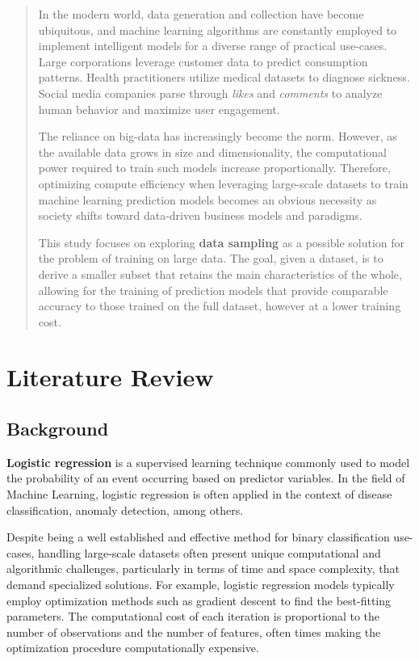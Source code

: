 \documentclass{article}
\theoremstyle{plain}
\theoremstyle{definition}
\theoremstyle{remark}
\begin{document}
\begin{abstract}

In the modern world, data generation and collection have become ubiquitous, and machine learning algorithms are constantly employed to implement intelligent models for a diverse range of practical use-cases. Large corporations leverage customer data to predict consumption patterns. Health practitioners utilize medical datasets to diagnose sickness. Social media companies parse through \textit{likes} and \textit{comments} to analyze human behavior and maximize user engagement.

The reliance on big-data has increasingly become the norm. However, as the available data grows in size and dimensionality, the computational power required to train such models increase proportionally. Therefore, optimizing compute efficiency when leveraging large-scale datasets to train machine learning prediction models becomes an obvious necessity as society shifts toward data-driven business models and paradigms.

This study focuses on exploring \textbf{data sampling} as a possible solution for the problem of training on large data. The goal, given a dataset, is to derive a smaller subset that retains the main characteristics of the whole, allowing for the training of prediction models that provide comparable accuracy to those trained on the full dataset, however at a lower training cost.

\end{abstract}

\section{Literature Review}
\label{submission}

\subsection{Background}

\textbf{Logistic regression} is a supervised learning technique commonly used to model the probability of an event occurring based on predictor variables. In the field of Machine Learning, logistic regression is often applied in the context of disease classification, anomaly detection, among others.

Despite being a well established and effective method for binary classification use-cases, handling large-scale datasets often present unique computational and algorithmic challenges, particularly in terms of time and space complexity, that demand specialized solutions. For example, logistic regression models typically employ optimization methods such as gradient descent to find the best-fitting parameters. The computational cost of each iteration is proportional to the number of observations and the number of features, often times making the optimization procedure computationally expensive.
\end{document}
